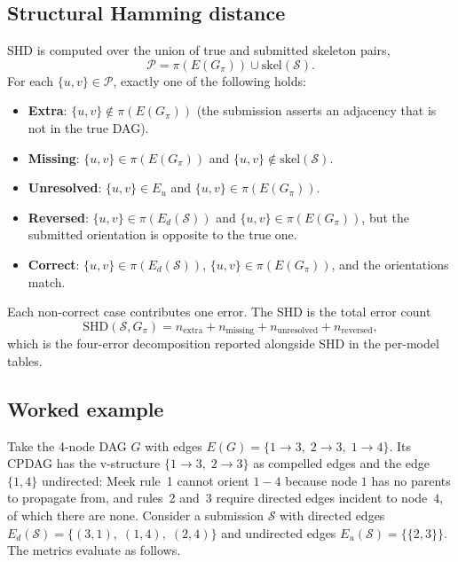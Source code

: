 \subsection{Structural Hamming distance}
\label{app:scoring:shd}

SHD is computed over the union of true and submitted skeleton pairs,
\begin{equation}
\mathcal{P} = \pi(E(G_\pi)) \cup \mathrm{skel}(\mathcal{S}).
\end{equation}
For each $\{u, v\} \in \mathcal{P}$, exactly one of the following holds:
\begin{itemize}
\itemsep0pt
\item \textbf{Extra}: $\{u, v\} \notin \pi(E(G_\pi))$ (the submission asserts an adjacency that is not in the true DAG).
\item \textbf{Missing}: $\{u, v\} \in \pi(E(G_\pi))$ and $\{u, v\} \notin \mathrm{skel}(\mathcal{S})$.
\item \textbf{Unresolved}: $\{u, v\} \in E_u$ and $\{u, v\} \in \pi(E(G_\pi))$.
\item \textbf{Reversed}: $\{u, v\} \in \pi(E_d(\mathcal{S}))$ and $\{u, v\} \in \pi(E(G_\pi))$, but the submitted orientation is opposite to the true one.
\item \textbf{Correct}: $\{u, v\} \in \pi(E_d(\mathcal{S}))$, $\{u, v\} \in \pi(E(G_\pi))$, and the orientations match.
\end{itemize}
Each non-correct case contributes one error. The SHD is the total error count
\begin{equation}
\mathrm{SHD}(\mathcal{S}, G_\pi) = n_{\text{extra}} + n_{\text{missing}} + n_{\text{unresolved}} + n_{\text{reversed}},
\end{equation}
which is the four-error decomposition reported alongside SHD in the per-model tables.

\subsection{Worked example}
\label{app:scoring:example}

Take the 4-node DAG $G$ with edges $E(G) = \{1{\to}3,\; 2{\to}3,\; 1{\to}4\}$. Its CPDAG has the v-structure $\{1{\to}3,\; 2{\to}3\}$ as compelled edges and the edge $\{1, 4\}$ undirected: Meek rule~1 cannot orient $1 - 4$ because node $1$ has no parents to propagate from, and rules~2 and~3 require directed edges incident to node~$4$, of which there are none. Consider a submission $\mathcal{S}$ with directed edges $E_d(\mathcal{S}) = \{(3, 1),\; (1, 4),\; (2, 4)\}$ and undirected edges $E_u(\mathcal{S}) = \{\{2, 3\}\}$. The metrics evaluate as follows.

